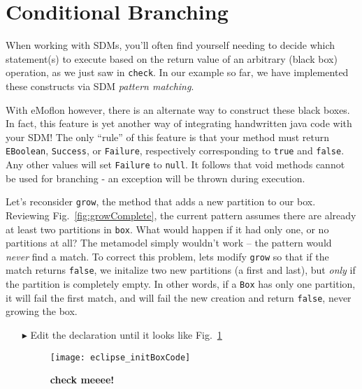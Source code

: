 \newpage
\hypertarget{sec:conBran}{}
\section{Conditional Branching}
\genHeader

When working with SDMs, you'll often find yourself needing to decide which statement(s) to execute based on the return value of an arbitrary (black box)
operation, as we just saw in \texttt{check}. In our example so far, we have implemented these constructs via SDM \emph{pattern matching}. 

With eMoflon however, there is an alternate way to construct these black boxes. In fact, this feature is yet another way of integrating handwritten java code
with your SDM! The only ``rule'' of this feature is that your method must return \texttt{EBoolean}, \texttt{Success}, or \texttt{Failure}, respectively
corresponding to \texttt{true} and \texttt{false}. Any other values will set \texttt{Failure} to \texttt{null}. It follows that void methods cannot be used for
branching - an exception will be thrown during execution.

Let's reconsider \texttt{grow}, the method that adds a new partition to our box. Reviewing Fig.~\ref{fig:growComplete}, the current pattern assumes
there are already at least two partitions in \texttt{box}. What would happen if it had only one, or no partitions at all? The metamodel simply wouldn't
work -- the pattern would \emph{never} find a match. To correct this problem, lets modify \texttt{grow} so that if the match returns \texttt{false}, we
initalize two new partitions (a first and last), but \emph{only} if the partition is completely empty. In other words, if a \texttt{Box} has only one partition,
it will fail the first match, and will fail the new creation and return \texttt{false}, never growing the box.







\newpage
\genHeader
\hypertarget{return conBran}{}

\begin{itemize}

\item[$\blacktriangleright$] Edit the declaration until it looks like Fig.~\ref{code:initBox}

\begin{figure}[htbp]
\begin{center}
  \texttt{[image: eclipse\_initBoxCode]}
  \caption{{\bf check meeee!}}  
  \label{code:initBox} 
\end{center}
\end{figure}
\FloatBarrier

\end{itemize}

